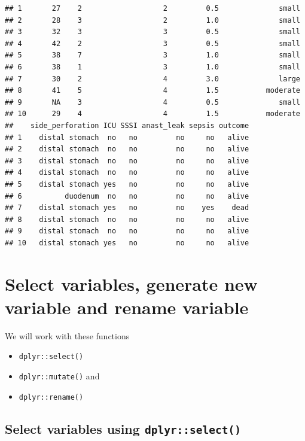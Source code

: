 \documentclass[
  10pt,
]{krantz}
\providecommand{\tightlist}{%
  \setlength{\itemsep}{0pt}\setlength{\parskip}{0pt}}
\begin{document}
\begin{verbatim}
## 1       27    2                   2         0.5              small
## 2       28    3                   2         1.0              small
## 3       32    3                   3         0.5              small
## 4       42    2                   3         0.5              small
## 5       38    7                   3         1.0              small
## 6       38    1                   3         1.0              small
## 7       30    2                   4         3.0              large
## 8       41    5                   4         1.5           moderate
## 9       NA    3                   4         0.5              small
## 10      29    4                   4         1.5           moderate
##    side_perforation ICU SSSI anast_leak sepsis outcome
## 1    distal stomach  no   no         no     no   alive
## 2    distal stomach  no   no         no     no   alive
## 3    distal stomach  no   no         no     no   alive
## 4    distal stomach  no   no         no     no   alive
## 5    distal stomach yes   no         no     no   alive
## 6          duodenum  no   no         no     no   alive
## 7    distal stomach yes   no         no    yes    dead
## 8    distal stomach  no   no         no     no   alive
## 9    distal stomach  no   no         no     no   alive
## 10   distal stomach yes   no         no     no   alive
\end{verbatim}

\hypertarget{select-variables-generate-new-variable-and-rename-variable}{%
\section{\texorpdfstring{Select variables, generate new variable and rename variable}{Select variables, generate new variable and rename variable}}\label{select-variables-generate-new-variable-and-rename-variable}}

We will work with these functions

\begin{itemize}
\tightlist
\item
  \texttt{dplyr::select()}
\item
  \texttt{dplyr::mutate()} and
\item
  \texttt{dplyr::rename()}
\end{itemize}

\hypertarget{select-variables-using-dplyrselect}{%
\subsection{\texorpdfstring{Select variables using \texttt{dplyr::select()}}{Select variables using dplyr::select()}}\label{select-variables-using-dplyrselect}}
\end{document}
